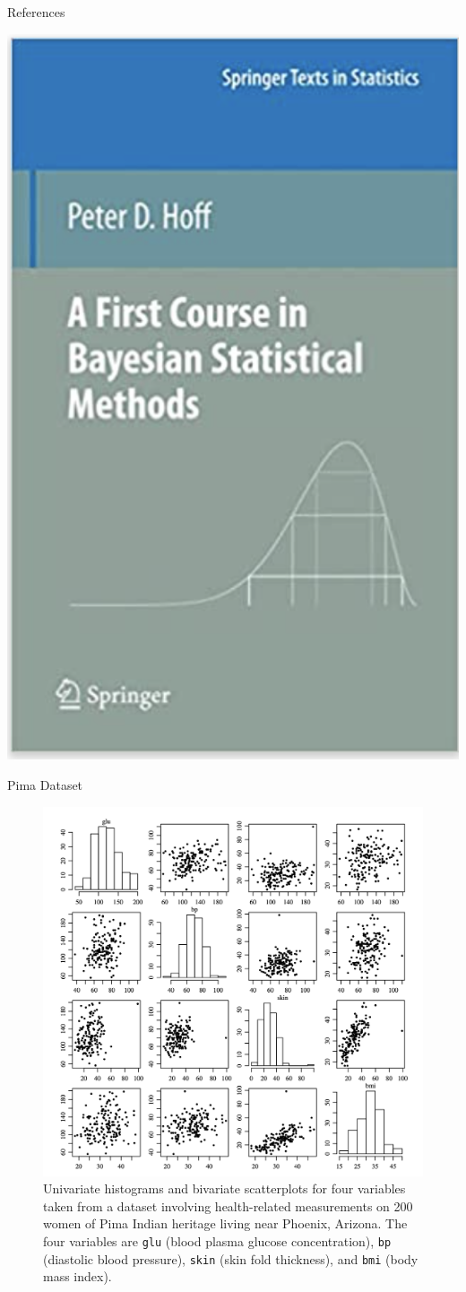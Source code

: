 \documentclass[10pt]{beamer}
\begin{document}
\begin{frame}{References}

\begin{center}
\includegraphics[width=.5\textwidth]{images/hoff_book}
\end{center}

\end{frame}

\begin{frame}{Pima Dataset}

\begin{figure}
\includegraphics[width=.6\textwidth]{images/pima_scatterplots}
\caption{  \footnotesize Univariate histograms and bivariate scatterplots for four variables taken from a dataset involving health-related measurements on 200 women of Pima Indian heritage living near Phoenix,  Arizona.  \scriptsize The four variables are \texttt{glu} (blood plasma glucose concentration),  \texttt{bp} (diastolic blood pressure),  \texttt{skin} (skin fold thickness),  and  \texttt{bmi} (body mass index).  }
\end{figure}

\end{frame}
\end{document}
